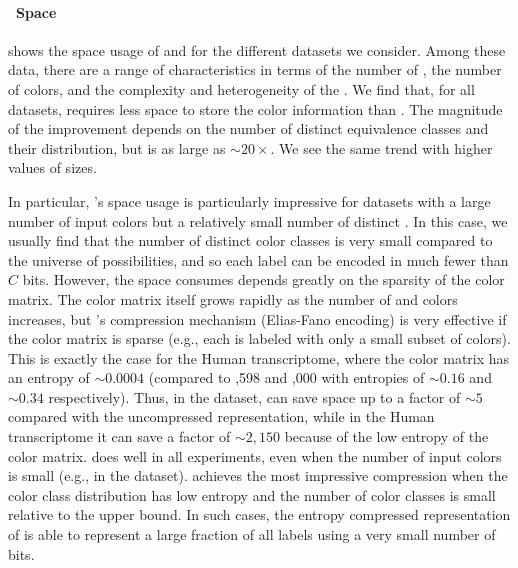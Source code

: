 \paragraph*{~Space} shows the space usage of \system and \vari
for the different datasets we consider. Among these data, there are a range of
characteristics in terms of the number of \kmers, the number of colors, and the
complexity and heterogeneity of the \dbg. We find that, for all datasets,
\system requires less space to store the color information than \vari.  The
magnitude of the improvement depends on the number of distinct equivalence
classes and their distribution, but is as large as $\sim 20\times$.  We see the
same trend with higher values of \kmer sizes.


In particular, \system's space usage is particularly impressive for datasets
with a large number of input colors but a relatively small number of distinct
\kmers. In this case, we usually find that the number of distinct color classes
is very small compared to the universe of possibilities, and so each label can
be encoded in much fewer than $C$ bits. However, the space \vari consumes
depends greatly on the sparsity of the color matrix. The color matrix itself
grows rapidly as the number of \kmers and colors increases, but \vari's
compression mechanism (Elias-Fano encoding) is very effective if the color
matrix is sparse (e.g., each \kmer is labeled with only a small subset of
colors). This is exactly the case for the Human transcriptome, where the color
matrix has an entropy of $\sim 0.0004$ (compared to ,598 and ,000 with entropies of $\sim 0.16$ and $\sim 0.34$ respectively). Thus, in the
\ecoli dataset, \vari can save space up to a factor of $\sim 5$ compared with
the uncompressed representation, while in the Human transcriptome it can save a
factor of $\sim 2,150$ because of the low entropy of the color matrix. \system
does well in all experiments, even when the number of input colors is small
(e.g., in the \plant dataset). \system achieves the most impressive compression
when the color class distribution has low entropy and the number of color classes
is small relative to the upper bound.
In such cases, the entropy compressed representation of \system is able to
represent a large fraction of all labels using a very small number of bits.


